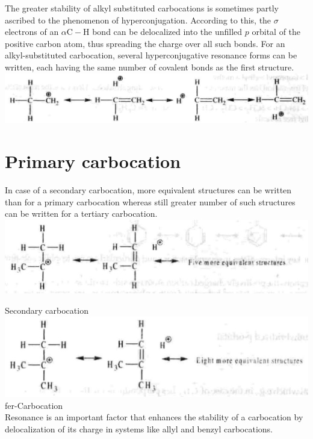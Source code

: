 \documentclass[10pt]{article}
\begin{document}
The greater stability of alkyl substituted carbocations is sometimes partly ascribed to the phenomenon of hyperconjugation. According to this, the $\sigma$ electrons of an $\alpha \mathrm{C}-\mathrm{H}$ bond can be delocalized into the unfilled $p$ orbital of the positive carbon atom, thus spreading the charge over all such bonds. For an alkyl-substituted carbocation, several hyperconjugative resonance forms can be written, each having the same number of covalent bonds as the first structure.\\
\includegraphics[max width=\textwidth, center]{2025_01_28_8470952b98110cec3aabg-086(4)}

\section*{Primary carbocation}
In case of a secondary carbocation, more equivalent structures can be written than for a primary carbocation whereas still greater number of such structures can be written for a tertiary carbocation.\\
\includegraphics[max width=\textwidth, center]{2025_01_28_8470952b98110cec3aabg-086(3)}

Secondary carbocation\\
\includegraphics[max width=\textwidth, center]{2025_01_28_8470952b98110cec3aabg-086(2)}\\
fer-Carbocation\\
Resonance is an important factor that enhances the stability of a carbocation by delocalization of its charge in systems like allyl and benzyl carbocations.
\end{document}
